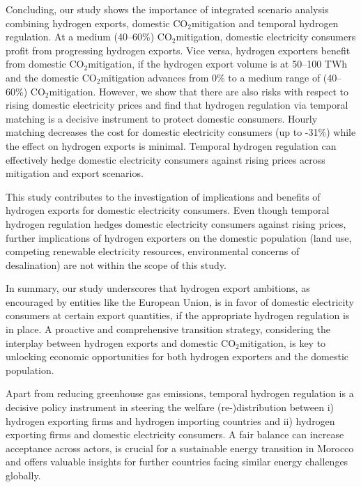 \documentclass[5p,numafflabel]{elsarticle}
\newcommand{\co}{\ce{CO2}~}
\def\co{CO${}_2${\:}}
\begin{document}
\label{sec:conclusion}



Concluding, our study shows the importance of integrated scenario analysis combining hydrogen exports, domestic \co mitigation and temporal hydrogen regulation.
At a medium (40--60\%) \co mitigation, domestic electricity consumers profit from progressing hydrogen exports. Vice versa, hydrogen exporters benefit from domestic \co mitigation, if the hydrogen export volume is at 50--100 TWh and the domestic \co mitigation advances from 0\% to a medium range of (40--60\%) \co mitigation. However, we show that there are also risks with respect to rising domestic electricity prices
and find that hydrogen regulation via temporal matching is a decisive instrument
to protect domestic consumers. Hourly matching decreases the cost for domestic electricity consumers (up to -31\%) while the effect on hydrogen exports is minimal. Temporal hydrogen regulation can effectively hedge domestic electricity consumers against rising prices across mitigation and export scenarios.

This study contributes to the investigation of implications and benefits of hydrogen exports for domestic electricity consumers. Even though temporal hydrogen regulation hedges domestic electricity consumers against rising prices, further implications of hydrogen exporters on the domestic population (land use, competing renewable electricity resources, environmental concerns of desalination) are not within the scope of this study.

In summary, our study underscores that hydrogen export ambitions, as encouraged by entities like the European Union, is in favor of domestic electricity consumers at certain export quantities, if the appropriate hydrogen regulation is in place. A proactive and comprehensive transition strategy, considering the interplay between hydrogen exports and domestic \co mitigation, is key to unlocking economic opportunities for both hydrogen exporters and the domestic population. 


Apart from reducing greenhouse gas emissions, temporal hydrogen regulation is a decisive policy instrument in steering the welfare (re-)distribution between i) hydrogen exporting firms and hydrogen importing countries and ii) hydrogen exporting firms and domestic electricity consumers. 
A fair balance can increase acceptance across actors, is crucial for a sustainable energy transition in Morocco and offers valuable insights for further countries facing similar energy challenges globally.
\end{document}
